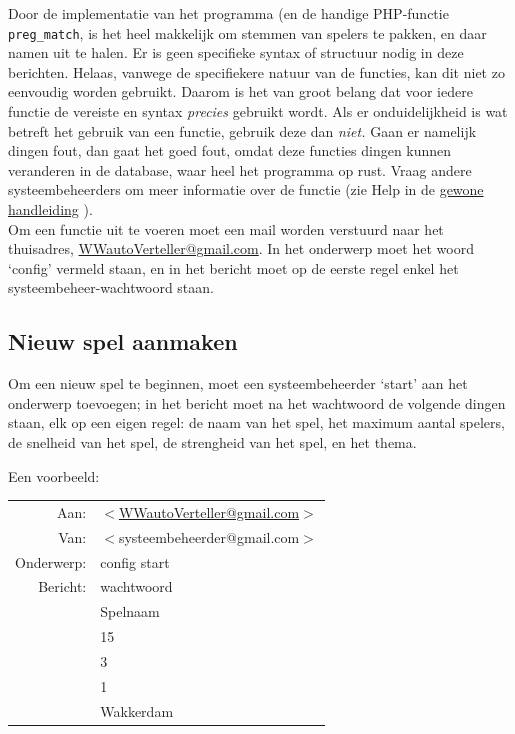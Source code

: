 \documentclass[12pt]{article}
\begin{document}
  Door de implementatie van het programma (en de handige PHP-functie {\tt preg\_match}, is het heel makkelijk om stemmen van spelers te pakken, en daar namen uit te halen. Er is geen specifieke syntax of structuur nodig in deze berichten. Helaas, vanwege de specifiekere natuur van de functies, kan dit niet zo eenvoudig worden gebruikt. Daarom is het van groot belang dat voor iedere functie de vereiste en syntax \emph{precies} gebruikt wordt. Als er onduidelijkheid is wat betreft het gebruik van een functie, gebruik deze dan \emph{niet.} Gaan er namelijk dingen fout, dan gaat het goed fout, omdat deze functies dingen kunnen veranderen in de database, waar heel het programma op rust. Vraag andere systeembeheerders om meer informatie over de functie (zie Help in de \href{http://www.liacs.nl/~vdekker/WW/pdf/man.pdf}{gewone handleiding} ).
  \\[\baselineskip]
  Om een functie uit te voeren moet een mail worden verstuurd naar het thuisadres, \href{mailto:<WWautoVerteller@gmail.com>}{WWautoVerteller@gmail.com}. In het onderwerp moet het woord `config' vermeld staan, en in het bericht moet op de eerste regel enkel het systeembeheer-wachtwoord staan.

  \subsection{Nieuw spel aanmaken}
  
    Om een nieuw spel te beginnen, moet een systeembeheerder `start' aan het onderwerp toevoegen; in het bericht moet na het wachtwoord de volgende dingen staan, elk op een eigen regel: de naam van het spel, het maximum aantal spelers, de snelheid van het spel, de strengheid van het spel, en het thema. 
    
    Een voorbeeld:
    
    \begin{center}
      \begin{tabularx}{0.75\textwidth}[c]{|r X|}
	\hline
	Aan: & \href{mailto:<WWautoVerteller@gmail.com>}{$<$WWautoVerteller@gmail.com$>$} \\
	Van: & $<$systeembeheerder@gmail.com$>$ \\
	Onderwerp: & config start \\[\baselineskip]	
	Bericht: & wachtwoord \\
	 & Spelnaam \\
	 & 15 \\
	 & 3 \\
	 & 1 \\
	 & Wakkerdam \\
	\hline
      \end{tabularx}
    \end{center}
    
\end{document}
